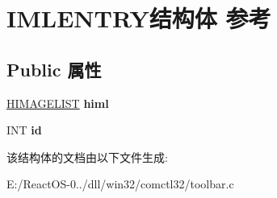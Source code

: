 \hypertarget{struct_i_m_l_e_n_t_r_y}{}\section{I\+M\+L\+E\+N\+T\+R\+Y结构体 参考}
\label{struct_i_m_l_e_n_t_r_y}
\subsection*{Public 属性}
\begin{DoxyCompactItemize}
\item 
\mbox{\label{struct_i_m_l_e_n_t_r_y_a6126bc3ab53911f9d1b35a3982c10afb}} 
\hyperlink{struct___i_m_a_g_e_l_i_s_t}{H\+I\+M\+A\+G\+E\+L\+I\+ST} {\bfseries himl}
\item 
\mbox{\label{struct_i_m_l_e_n_t_r_y_a483e16c3dbfbcabe8d8cadcd6452b131}} 
I\+NT {\bfseries id}
\end{DoxyCompactItemize}


该结构体的文档由以下文件生成\+:\begin{DoxyCompactItemize}
\item 
E\+:/\+React\+O\+S-\/0../dll/win32/comctl32/toolbar.\+c\end{DoxyCompactItemize}

